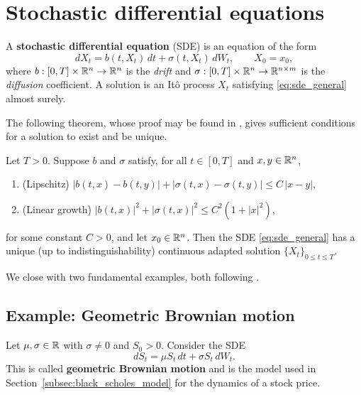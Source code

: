 \section{Stochastic differential equations}

A \textbf{stochastic differential equation} (SDE) is an equation of the form
\begin{equation}\label{eq:sde_general}
    dX_t = b(t, X_t)\, dt + \sigma(t, X_t)\, dW_t, \qquad X_0 = x_0,
\end{equation}
where $b: [0,T] \times \mathbb{R}^n \to \mathbb{R}^n$ is the \textit{drift} and
$\sigma: [0,T] \times \mathbb{R}^n \to \mathbb{R}^{n \times m}$ is the \textit{diffusion} coefficient.
A solution is an Itô process $X_t$ satisfying \eqref{eq:sde_general} almost surely.

The following theorem, whose proof may be found in \cite[Thm.~5.2.1]{oksendal_sde},
gives sufficient conditions for a solution to exist and be unique.

\begin{theorem}\label{thm:sde_existence}
    Let $T > 0$.
    Suppose $b$ and $\sigma$ satisfy, for all $t \in [0,T]$ and $x, y \in \mathbb{R}^n$,
    \begin{enumerate}
        \item \textup{(Lipschitz)} $|b(t,x) - b(t,y)| + |\sigma(t,x) - \sigma(t,y)| \leq C\,|x - y|$,
        \item \textup{(Linear growth)} $|b(t,x)|^2 + |\sigma(t,x)|^2 \leq C^2(1 + |x|^2)$,
    \end{enumerate}
    for some constant $C > 0$, and let $x_0 \in \mathbb{R}^n$.
    Then the SDE \eqref{eq:sde_general} has a unique (up to indistinguishability)
    continuous adapted solution $\{X_t\}_{0 \leq t \leq T}$.
\end{theorem}

We close with two fundamental examples, both following \cite[Ch.~5]{oksendal_sde}.

\subsection{Example: Geometric Brownian motion}

Let $\mu, \sigma \in \mathbb{R}$ with $\sigma \neq 0$ and $S_0 > 0$.
Consider the SDE
\begin{equation}\label{eq:gbm_sde}
    dS_t = \mu S_t\, dt + \sigma S_t\, dW_t.
\end{equation}
This is called \textbf{geometric Brownian motion} and is the model used in Section~\ref{subsec:black_scholes_model}
for the dynamics of a stock price.

